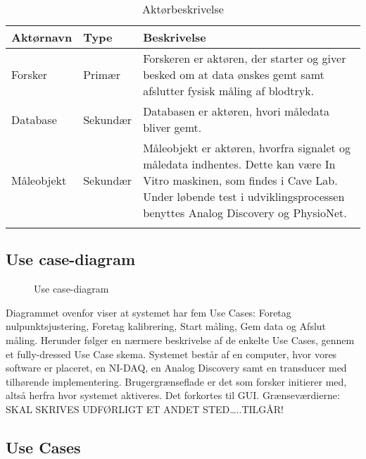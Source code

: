\begin{table}[H]
\begin{tabularx}{\textwidth}{l l X}
     Aktørnavn	&	Type		&	Beskrivelse \\ \midrule
     Forsker   	& 	Primær  	& 	Forskeren er aktøren, der starter og giver besked om at data ønskes gemt samt afslutter fysisk måling af blodtryk. \\ 			  \addlinespace[2mm]
     Database	&	Sekundær	&	Databasen er aktøren, hvori måledata bliver gemt. \\   \addlinespace[2mm]
     Måleobjekt	&	Sekundær	&	Måleobjekt er aktøren, hvorfra signalet og måledata indhentes. Dette kan være In Vitro maskinen, som findes i Cave Lab. Under løbende test i udviklingsprocessen benyttes Analog Discovery og PhysioNet. \\   \addlinespace[2mm]
     
   
     \bottomrule                                                                                                                   
    \end{tabularx}
    \caption {Aktørbeskrivelse}
    \label{tab:aktoerbeskrivelse}
	
\end{table}

\subsection{Use case-diagram}

\begin{figure}[H]
	\centering
	\caption{Use case-diagram}
	\label{fig:Use Cases}
\end{figure}

Diagrammet ovenfor viser at systemet har fem Use Cases: Foretag nulpunktsjustering, Foretag kalibrering, Start måling, Gem data og Afslut måling. Herunder følger en nærmere beskrivelse af de enkelte Use Cases, gennem et fully-dressed Use Case skema. 
Systemet består af en computer, hvor vores software er placeret, en NI-DAQ, en Analog Discovery samt en transducer med tilhørende implementering. 
Brugergrænseflade er det som forsker initierer med, altså herfra hvor systemet aktiveres. Det forkortes til GUI. Grænseværdierne: SKAL SKRIVES UDFØRLIGT ET ANDET STED…..TILGÅR!



\subsection{Use Cases}

